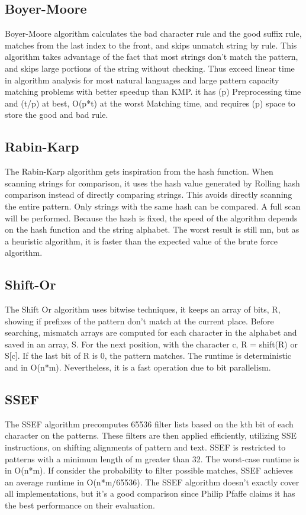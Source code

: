 \documentclass[11pt]{article}       %
\begin{document}
\subsection{Boyer-Moore}\label{bm}
Boyer-Moore algorithm calculates the bad character rule and the good suffix rule\cite{BM}, matches from the last index to the front, and skips unmatch string by rule. This algorithm takes advantage of the fact that most strings don’t match the pattern, and skips large portions of the string without checking. Thus exceed linear time in algorithm analysis for most natural languages and large pattern capacity matching problems with better speedup than KMP. it has (p) Preprocessing time and  (t/p) at best, O(p*t) at the worst Matching time, and requires (p) space to store the good and bad rule.


\subsection{Rabin-Karp}\label{rk}
The Rabin-Karp algorithm gets inspiration from the hash function. When scanning strings for comparison, it uses the hash value generated by Rolling hash comparison instead of directly comparing strings\cite{KR}. This avoids directly scanning the entire pattern. Only strings with the same hash can be compared. A full scan will be performed. Because the hash is fixed, the speed of the algorithm depends on the hash function and the string alphabet. The worst result is still mn, but as a heuristic algorithm, it is faster than the expected value of the brute force algorithm.

\subsection{Shift-Or}\label{so}
The Shift Or algorithm uses bitwise techniques\cite{Matching}, it keeps an array of bits, R, showing if prefixes of the pattern don't match at the current place. Before searching, mismatch arrays are computed for each character in the alphabet and saved in an array, S. For the next position, with the character c, R = shift(R) or S[c]. If the last bit of R is 0, the pattern matches. The runtime is deterministic and in O(n*m). Nevertheless, it is a fast operation due to bit parallelism.

\subsection{SSEF}\label{SSEF}
The SSEF algorithm precomputes 65536 filter lists based on the kth bit of each character on the patterns\cite{Matching}. These filters are then applied efficiently, utilizing SSE instructions, on shifting alignments of pattern and text. SSEF is restricted to patterns with a minimum length of m greater than 32. The worst-case runtime is in O(n*m). If consider the probability to filter possible matches, SSEF achieves an average runtime in O(n*m/65536). The SSEF algorithm doesn't exactly cover all implementations, but it's a good comparison since Philip Pfaffe claims it has the best performance on their evaluation\cite{SSEF}.
\end{document}
